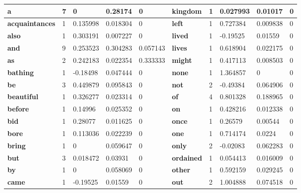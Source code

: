 \begin{table}[]
\small
\begin{tabular}{|l|l|l|l|l|l|l|l|l|l|}
\hline
\textbf{a}             & 7 & 0        & 0.28174  & 0        & \textbf{kingdom}   & 1 & 0.027993 & 0.01017  & 0        \\ \hline
\textbf{acquaintances} & 1 & 0.135998 & 0.018304 & 0        & \textbf{left}      & 1 & 0.727384 & 0.009838 & 0        \\ \hline
\textbf{also}          & 1 & 0.303191 & 0.007227 & 0        & \textbf{lived}     & 1 & -0.19525 & 0.01559  & 0        \\ \hline
\textbf{and}           & 9 & 0.253523 & 0.304283 & 0.057143 & \textbf{lives}     & 1 & 0.618904 & 0.022175 & 0        \\ \hline
\textbf{as}            & 2 & 0.242183 & 0.022354 & 0.333333 & \textbf{might}     & 1 & 0.417113 & 0.008503 & 0        \\ \hline
\textbf{bathing}       & 1 & -0.18498 & 0.047444 & 0        & \textbf{none}      & 1 & 1.364857 & 0        & 0        \\ \hline
\textbf{be}            & 3 & 0.449879 & 0.095843 & 0        & \textbf{not}       & 2 & -0.49384 & 0.064906 & 0        \\ \hline
\textbf{beautiful}     & 1 & 0.326277 & 0.023314 & 0        & \textbf{of}        & 4 & 0.801328 & 0.188965 & 0        \\ \hline
\textbf{before}        & 1 & 0.14996  & 0.025352 & 0        & \textbf{on}        & 1 & 0.428216 & 0.012338 & 0        \\ \hline
\textbf{bid}           & 1 & 0.28077  & 0.011625 & 0        & \textbf{once}      & 1 & 0.26579  & 0.00544  & 0        \\ \hline
\textbf{bore}          & 1 & 0.113036 & 0.022239 & 0        & \textbf{one}       & 1 & 0.714174 & 0.0224   & 0        \\ \hline
\textbf{bring}         & 1 & 0        & 0.059647 & 0        & \textbf{only}      & 2 & -0.02083 & 0.062283 & 0        \\ \hline
\textbf{but}           & 3 & 0.018472 & 0.03931  & 0        & \textbf{ordained}  & 1 & 0.054413 & 0.016009 & 0        \\ \hline
\textbf{by}            & 1 & 0        & 0.058069 & 0        & \textbf{other}     & 1 & 0.592159 & 0.029245 & 0        \\ \hline
\textbf{came}          & 1 & -0.19525 & 0.01559  & 0        & \textbf{out}       & 2 & 1.004888 & 0.074518 & 0        \\ \hline

\end{tabular}
\end{table}
